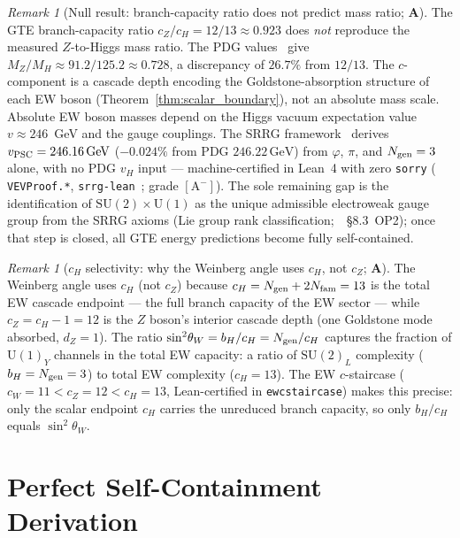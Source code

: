 \documentclass[11pt]{article}
\theoremstyle{remark}
\newtheorem{remark}[theorem]{Remark}
\newcommand{\Ngen}{N_{\rm gen}}
\newcommand{\Nfam}{N_{\rm fam}}
\newcommand{\lean}[1]{%
  \penalty-100
  \begingroup\def\_{\textunderscore\allowbreak}\texttt{#1}\endgroup}
\newcommand{\sinwsq}{\sin^2\!\theta_W}
\newcommand{\CatA}{\textbf{A}}
\begin{document}
\begin{remark}[Null result: branch-capacity ratio does not predict mass ratio; $\CatA$]
\label{rem:c_ratio_null}
The GTE branch-capacity ratio $c_Z/c_H = 12/13 \approx 0.923$ does \emph{not}
reproduce the measured $Z$-to-Higgs mass ratio.
The PDG values~\cite{ParticleDataGroup2022} give $M_Z/M_H \approx 91.2/125.2 \approx 0.728$,
a discrepancy of $26.7\%$ from $12/13$.
The $c$-component is a cascade depth encoding the Goldstone-absorption structure of
each EW boson (Theorem~\ref{thm:scalar_boundary}), not an absolute mass scale.
Absolute EW boson masses depend on the Higgs vacuum expectation value $v \approx 246$~GeV
and the gauge couplings.  The SRRG framework~\cite{SpivackSRRG} derives
$v_{\rm PSC} = 246.16\,\text{GeV}$ ($-0.024\%$ from PDG $246.22\,\text{GeV}$) from
$\varphi$, $\pi$, and $N_{\rm gen} = 3$ alone, with no PDG $v_H$ input ---
machine-certified in Lean~4 with zero \texttt{sorry}
(\lean{VEVProof.*}, \texttt{srrg-lean}~\cite{srrg-lean}; grade $[\mathrm{A}^-]$).
The sole remaining gap is the identification of
$\mathrm{SU}(2)\!\times\!\mathrm{U}(1)$ as the unique admissible electroweak gauge group
from the SRRG axioms (Lie group rank classification;~\cite{SpivackSRRG}~\S8.3~OP2);
once that step is closed, all GTE energy predictions become fully self-contained.
\end{remark}

\begin{remark}[$c_H$ selectivity: why the Weinberg angle uses $c_H$, not $c_Z$; $\CatA$]
\label{rem:cH_selectivity}
The Weinberg angle uses $c_H$ (not $c_Z$) because $c_H = \Ngen + 2\Nfam = 13$
is the total EW cascade endpoint --- the full branch capacity of the EW sector ---
while $c_Z = c_H - 1 = 12$ is the $Z$ boson's interior cascade depth
(one Goldstone mode absorbed, $d_Z = 1$).
The ratio $\sinwsq = b_H/c_H = \Ngen/c_H$ captures the fraction of
$\mathrm{U}(1)_Y$ channels in the total EW capacity: a ratio of
$\mathrm{SU}(2)_L$ complexity ($b_H = \Ngen = 3$) to total EW complexity ($c_H = 13$).
The EW $c$-staircase ($c_W = 11 < c_Z = 12 < c_H = 13$, Lean-certified in
\lean{ew\_c\_staircase}) makes this precise: only the scalar endpoint $c_H$ carries
the unreduced branch capacity, so only $b_H/c_H$ equals $\sinwsq$.
\end{remark}

\section{Perfect Self-Containment Derivation}
\label{sec:psc}
\end{document}
